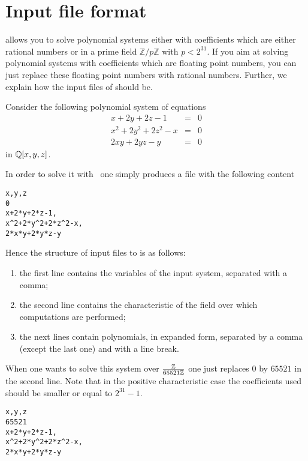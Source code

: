 \documentclass[a4paper,english,11pt]{scrartcl}
\theoremstyle{definition}
\theoremstyle{remark}
\begin{document}
\section{Input file format}

\msolve allows you to solve polynomial systems either with coefficients
which are either rational numbers or in a prime field $\mathbb{Z}/p\mathbb{Z}$
with $p < 2^{31}$. If you aim at solving polynomial systems with coefficients
which are floating point numbers, you can just replace these floating point
numbers with rational numbers. Further, we explain how the input files of
\msolve should be.

Consider the following polynomial system of equations
\[
  \begin{array}{rcl}
    x+2 y+2 z-1 &= &0\\
    x^2+2 y^2+2 z^2-x &= &0\\
    2 x y+2 y z-y &= &0
  \end{array}
\]
in $\mathbb{Q}[x,y,z]$.

In order to solve it with \msolve~one simply produces a file with the following content
\begin{tcolorbox}
\begin{verbatim}
x,y,z
0
x+2*y+2*z-1,
x^2+2*y^2+2*z^2-x,
2*x*y+2*y*z-y
\end{verbatim}  
\end{tcolorbox}
Hence the structure of input files to \msolve is as follows:
\begin{enumerate}
\item the first line contains the variables of the input system, separated with
  a comma; 
\item the second line contains the characteristic of the field over which
  computations are performed; 
\item the next lines contain polynomials, in expanded form, separated by a comma
  (except the last one) and with a line break. 
\end{enumerate}



When one wants to solve this system over $\frac{\mathbb{Z}}{65521\mathbb{Z}}$ one just replaces
$0$ by $65521$ in the second line. Note that in the positive characteristic case
the coefficients used should be smaller or equal to $2^{31}-1$.

\begin{tcolorbox}
\begin{verbatim}
x,y,z
65521
x+2*y+2*z-1,
x^2+2*y^2+2*z^2-x,
2*x*y+2*y*z-y
\end{verbatim}  
\end{tcolorbox}
\end{document}
